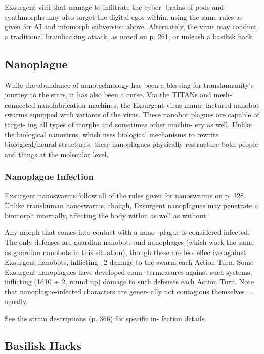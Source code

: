 Exsurgent virii that manage to infiltrate the cyber-
brains of pods and synthmorphs may also target the 
digital egos within, using the same rules as given for 
AI and infomorph subversion above. Alternately, the 
virus may conduct a traditional brainhacking attack, 
as noted on p. 261, or unleash a basilisk hack. 

\subsection{Nanoplague}

While the abundance of nanotechnology has been a 
blessing for transhumanity's journey to the stars, it has 
also been a curse. Via the TITANs and mesh-connected 
nanofabrication machines, the Exsurgent virus manu-
factured nanobot swarms equipped with variants of 
the virus. These nanobot plagues are capable of target-
ing all types of morphs and sometimes other machin-
ery as well. Unlike the biological nanovirus, which uses 
biological mechanisms to rewrite biological/neural 
structures, these nanoplagues physically restructure 
both people and things at the molecular level.

\subsubsection{Nanoplague Infection}

Exsurgent nanoswarms follow all of the rules given 
for nanoswarms on p. 328. Unlike transhuman 
nanoswarms, though, Exsurgent nanoplagues may 
penetrate a biomorph internally, affecting the body 
within as well as without.

Any morph that comes into contact with a nano-
plague is considered infected. The only defenses are 
guardian nanobots and nanophages (which work the 
same as guardian nanobots in this situation), though 
these are less effective against Exsurgent nanobots, 
inflicting –2 damage to the swarm each Action Turn. 
Some Exsurgent nanoplagues have developed coun-
termeasures against such systems, inflicting (1d10 ÷ 2, 
round up) damage to such defenses each Action Turn. 
Note that nanoplague-infected characters are gener-
ally not contagious themselves ... usually.

See the strain descriptions (p. 366) for specific in-
fection details.

\subsection{Basilisk Hacks}

